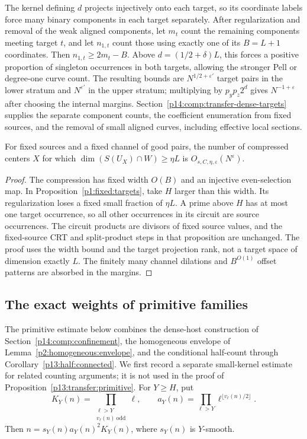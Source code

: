 The kernel defining $d$ projects injectively onto each target, so its
coordinate labels force many binary components in each target separately.
After regularization and removal of the weak aligned components, let
$m_t$ count the remaining components meeting target $t$, and let $n_{1,t}$
count those using exactly one of its $B=L+1$ coordinates. Then
$n_{1,t}\geq2m_t-B$. Above $d=(1/2+\delta)L$, this forces a positive
proportion of singleton occurrences in both targets, allowing the stronger
Pell or degree-one curve count. The resulting bounds are
$N^{1/2+\varepsilon'}$ target pairs in the lower stratum and
$N^{\varepsilon'}$ in the upper stratum; multiplying by $p_yp_z2^d$
gives $N^{-1+\varepsilon}$ after choosing the internal margins.
Section~\ref{p14:comp:transfer-dense-targets} supplies the separate
component counts, the coefficient enumeration from fixed sources, and
the removal of small aligned curves, including effective local sections.


\begin{lemma}
\label{p13:transfer:compressed-target}
For fixed sources and a fixed channel of good pairs, the number of
compressed centers $X$ for which
$\dim(S(U_X)\cap W)\geq\eta L$ is $O_{s,C,\eta,\varepsilon}(N^\varepsilon)$.
\end{lemma}

\begin{proof}
The compression has fixed width $O(B)$ and an injective even-selection
map. In Proposition~\ref{p1:fixed:targets}, take $H$ larger than this
width. Its regularization loses a fixed small fraction of $\eta L$.
A prime above $H$ has at most one target occurrence, so all other
occurrences in its circuit are source occurrences. The circuit products
are divisors of fixed source values, and the fixed-source CRT and
split-product steps in that proposition are unchanged. The proof uses
the width bound and the target projection rank, not a target space of
dimension exactly $L$. The finitely many channel dilations and
$B^{O(1)}$ offset patterns are absorbed in the margins.
\end{proof}

\subsection{The exact weights of primitive families}

The primitive estimate below combines the dense-host construction of
Section~\ref{p14:comp:confinement}, the homogeneous envelope of
Lemma~\ref{p2:homogeneous:envelope}, and the conditional half-count
through Corollary~\ref{p13:half:connected}.
We first record a separate small-kernel estimate for related counting
arguments; it is not used in the proof of
Proposition~\ref{p13:transfer:primitive}.
For $Y\geq H$, put
\[
 K_Y(n)=\prod_{\substack{\ell>Y\\v_\ell(n)\ \mathrm{odd}}}\ell,\qquad
 a_Y(n)=\prod_{\ell>Y}\ell^{\lfloor v_\ell(n)/2\rfloor}.
\]
Then $n=s_Y(n)a_Y(n)^2K_Y(n)$, where $s_Y(n)$ is $Y$-smooth.

